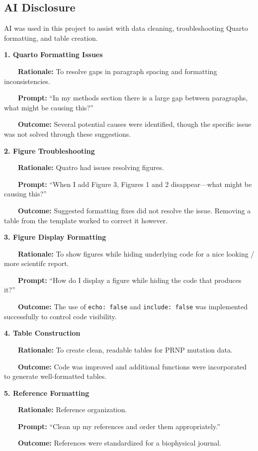 \documentclass[
  twocolumn]{biophys-new-mod}
\begin{document}
\newpage

\subsection{AI Disclosure}\label{ai-disclosure}

AI was used in this project to assist with data cleaning,
troubleshooting Quarto formatting, and table creation.

\textbf{1. Quarto Formatting Issues}\\
\strut ~~~~\textbf{Rationale:} To resolve gaps in paragraph spacing and
formatting inconsistencies.\\
\strut ~~~~\textbf{Prompt:} ``In my methods section there is a large gap
between paragraphs, what might be causing this?''\\
\strut ~~~~\textbf{Outcome:} Several potential causes were identified,
though the specific issue was not solved through these suggestions.

\textbf{2. Figure Troubleshooting}\\
\strut ~~~~\textbf{Rationale:} Quatro had issues resolving figures.\\
\strut ~~~~\textbf{Prompt:} ``When I add Figure 3, Figures 1 and 2
disappear---what might be causing this?''\\
\strut ~~~~\textbf{Outcome:} Suggested formatting fixes did not resolve
the issue. Removing a table from the template worked to correct it
however.

\textbf{3. Figure Display Formatting}\\
\strut ~~~~\textbf{Rationale:} To show figures while hiding underlying
code for a nice looking / more scientifc report.\\
\strut ~~~~\textbf{Prompt:} ``How do I display a figure while hiding the
code that produces it?''\\
\strut ~~~~\textbf{Outcome:} The use of \texttt{echo:\ false} and
\texttt{include:\ false} was implemented successfully to control code
visibility.

\textbf{4. Table Construction}\\
\strut ~~~~\textbf{Rationale:} To create clean, readable tables for PRNP
mutation data.\\
\strut ~~~~\textbf{Outcome:} Code was improved and additional functions
were incorporated to generate well-formatted tables.

\textbf{5. Reference Formatting}\\
\strut ~~~~\textbf{Rationale:} Reference organization.\\
\strut ~~~~\textbf{Prompt:} ``Clean up my references and order them
appropriately.''\\
\strut ~~~~\textbf{Outcome:} References were standardized for a
biophysical journal.
\end{document}
